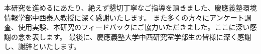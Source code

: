 \begin{acknowledgment}
本研究を進めるにあたり、絶えず懇切丁寧なご指導を頂きました、慶應義塾環境情報学部中西泰人教授に深く感謝いたします。 また多くの方々にアンケート調査、使用実験、本研究のフィードバックにご協力いただきました。ここに深い感謝の念を表します。 最後に、慶應義塾大学中西研究室学部生の皆様に深く感謝し、謝辞といたします。 
\end{acknowledgment}
